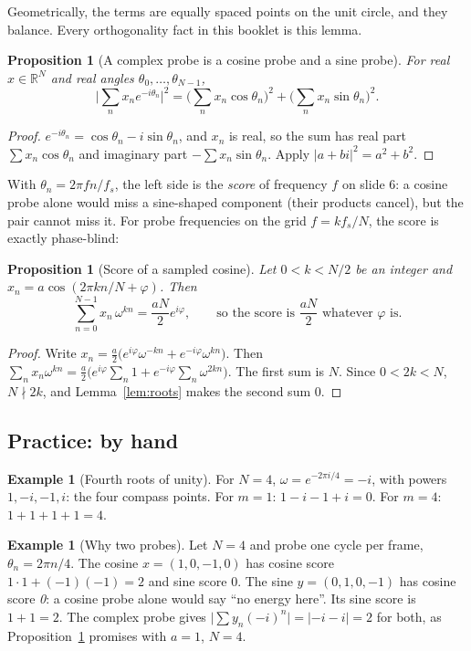 \documentclass[11pt]{article}
\newtheorem{proposition}[theorem]{Proposition}
\theoremstyle{definition}
\newtheorem{example}[theorem]{Example}
\newcommand{\R}{\mathbb{R}}
\newcommand{\abs}[1]{\lvert #1\rvert}
\begin{document}
Geometrically, the terms are equally spaced points on the unit circle, and they
balance. Every orthogonality fact in this booklet is this lemma.

\begin{proposition}[A complex probe is a cosine probe and a sine probe]\label{prop:probe}
For real $x\in\R^N$ and real angles $\theta_0,\dots,\theta_{N-1}$,
\[
\Big\lvert\sum_{n}x_ne^{-i\theta_n}\Big\rvert^2
=\Big(\sum_nx_n\cos\theta_n\Big)^2+\Big(\sum_nx_n\sin\theta_n\Big)^2.
\]
\end{proposition}
\begin{proof}
$e^{-i\theta_n}=\cos\theta_n-i\sin\theta_n$, and $x_n$ is real, so the sum has real
part $\sum x_n\cos\theta_n$ and imaginary part $-\sum x_n\sin\theta_n$. Apply
$\abs{a+bi}^2=a^2+b^2$.
\end{proof}

With $\theta_n=2\pi fn/f_s$, the left side is the \emph{score} of frequency $f$ on
slide 6: a cosine probe alone would miss a sine-shaped component (their products
cancel), but the pair cannot miss it. For probe frequencies on the grid $f=kf_s/N$,
the score is exactly phase-blind:

\begin{proposition}[Score of a sampled cosine]\label{prop:cosbin}
Let $0<k<N/2$ be an integer and $x_n=a\cos(2\pi kn/N+\varphi)$. Then
\[
\sum_{n=0}^{N-1}x_n\,\omega^{kn}=\frac{aN}{2}e^{i\varphi},
\qquad\text{so the score is }\frac{aN}{2}\text{ whatever }\varphi\text{ is.}
\]
\end{proposition}
\begin{proof}
Write $x_n=\frac a2\big(e^{i\varphi}\omega^{-kn}+e^{-i\varphi}\omega^{kn}\big)$. Then
$\sum_nx_n\omega^{kn}=\frac a2\big(e^{i\varphi}\sum_n1+e^{-i\varphi}\sum_n\omega^{2kn}\big)$.
The first sum is $N$. Since $0<2k<N$, $N\nmid 2k$, and Lemma~\ref{lem:roots} makes the
second sum 0.
\end{proof}

\subsection{Practice: by hand}

\begin{example}[Fourth roots of unity]
For $N=4$, $\omega=e^{-2\pi i/4}=-i$, with powers $1,-i,-1,i$: the four compass
points. For $m=1$: $1-i-1+i=0$. For $m=4$: $1+1+1+1=4$.
\end{example}

\begin{example}[Why two probes]
Let $N=4$ and probe one cycle per frame, $\theta_n=2\pi n/4$. The cosine
$x=(1,0,-1,0)$ has cosine score $1\cdot1+(-1)(-1)=2$ and sine score 0. The sine
$y=(0,1,0,-1)$ has cosine score \emph{0}: a cosine probe alone would say ``no energy
here''. Its sine score is $1+1=2$. The complex probe gives
$\abs{\sum y_n(-i)^n}=\abs{-i-i}=2$ for both, as
Proposition~\ref{prop:cosbin} promises with $a=1$, $N=4$.
\end{example}
\end{document}
